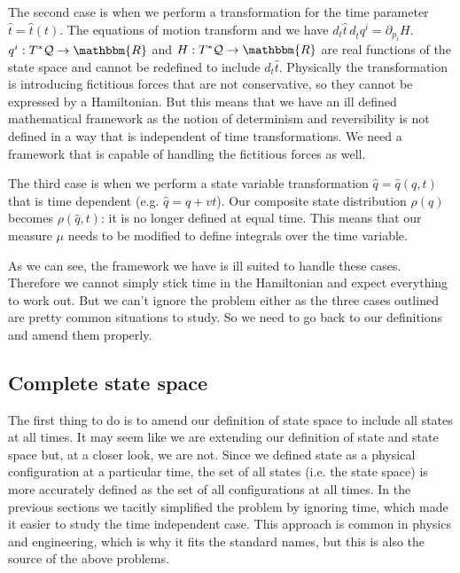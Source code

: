 \documentclass[aps,pra,10pt,twocolumn,floatfix,nofootinbib]{revtex4-1}
\numberwithin{equation}{section}
\theoremstyle{definition}
\begin{document}
The second case is when we perform a transformation for the time parameter $\hat{t}=\hat{t}(t)$. The equations of motion transform and we have $d_{t}\hat{t} \, d_{\hat{t}}q^i = \partial_{p_i} H$. $q^i: T^*\mathcal{Q} \rightarrow \mathbbm{R}$ and $H: T^*\mathcal{Q} \rightarrow \mathbbm{R}$ are real functions of the state space and cannot be redefined to include $d_{t}\hat{t}$. Physically the transformation is introducing fictitious forces that are not conservative, so they cannot be expressed by a Hamiltonian. But this means that we have an ill defined mathematical framework as the notion of determinism and reversibility is not defined in a way that is independent of time transformations. We need a framework that is capable of handling the fictitious forces as well.

The third case is when we perform a state variable transformation $\hat{q}=\hat{q}(q,t)$ that is time dependent (e.g. $\hat{q}=q+vt$). Our composite state distribution $\rho(q)$ becomes $\rho(\hat{q},t)$: it is no longer defined at equal time. This means that our measure $\mu$ needs to be modified to define integrals over the time variable.

As we can see, the framework we have is ill suited to handle these cases. Therefore we cannot simply stick time in the Hamiltonian and expect everything to work out. But we can't ignore the problem either as the three cases outlined are pretty common situations to study. So we need to go back to our definitions and amend them properly.

\subsection{Complete state space}

The first thing to do is to amend our definition of state space to include all states at all times. It may seem like we are extending our definition of state and state space but, at a closer look, we are not. Since we defined state as a physical configuration at a particular time, the set of all states (i.e. the state space) is more accurately defined as the set of all configurations at all times. In the previous sections we tacitly simplified the problem by ignoring time, which made it easier to study the time independent case. This approach is common in physics and engineering, which is why it fits the standard names, but this is also the source of the above problems.
\end{document}
